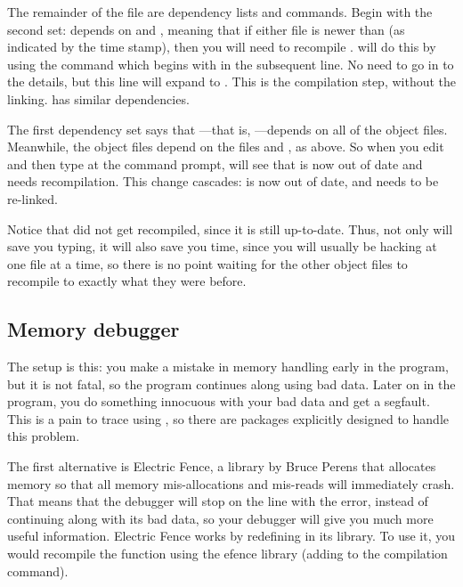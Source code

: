\documentclass[12pt]{article}
\makeatletter
\def\ind#1{\index{#1}#1}
\def\ttind#1{\index{#1@\cinline{#1}}\cinline{#1}}
\makeatother
\begin{document}
The remainder of the file are dependency lists and commands. Begin
with the second set:  depends on  and , meaning that if either file is newer than 
(as indicated by the time stamp), then you will need to recompile .  will do this by using the command which begins with
 in the subsequent line. No need to go in to the details, but
this line will expand to . This
is the compilation step, without the linking.  has similar
dependencies.

The first dependency set says that ---that is, ---depends on all of the object files. Meanwhile, the object files
depend on the  files and , as above. So when
you edit  and then type  at the command prompt,
 will see that  is now out of date and needs
recompilation. This change cascades:  is now out of date,
and needs to be re-linked.

Notice that  did not get recompiled, since it is still
up-to-date. Thus, not only will  save you typing, it will also
save you time, since you will usually be hacking at one file at a time,
so there is no point waiting for the other object files to recompile
to exactly what they were before. 

\subsection{Memory debugger}  

The setup is this: you make a mistake in memory handling early in the
program, but it is not fatal, so the program continues along using bad
data. Later on in the program, you do something innocuous with your bad
data and get a segfault. This is a pain to trace using , so
there are packages explicitly designed to handle this problem.

The first alternative is \ind{Electric Fence}, a
library by Bruce Perens that allocates memory so that all memory
mis-allocations and mis-reads will immediately crash.  That means that
the debugger will stop on the line with the error, instead of continuing
along with its bad data, so your debugger will give you much more useful
information.  Electric Fence works by redefining \ttind{malloc} in 
its library. To use it, you would recompile the function
using the efence library (adding  to the compilation
command).
\end{document}
